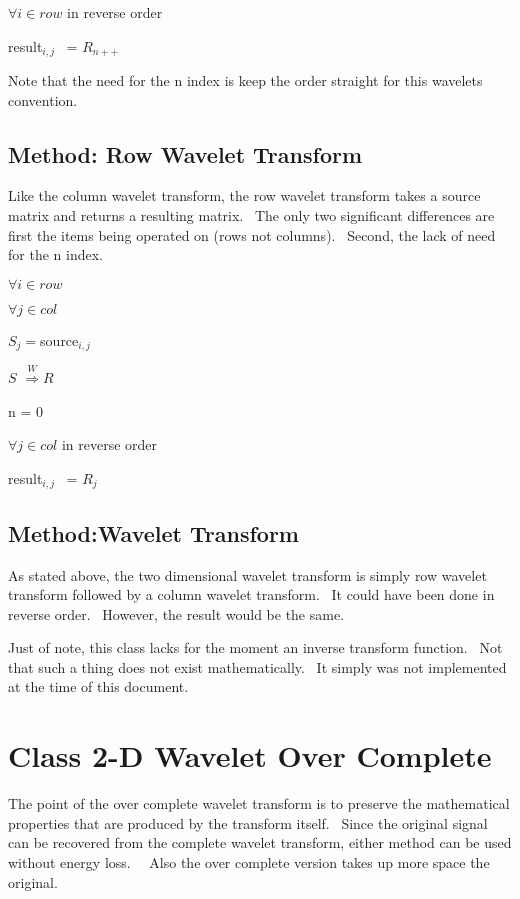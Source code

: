\documentclass{article}
\begin{document}
\qquad \qquad $\forall i\in row$ in reverse order

\qquad \qquad \qquad result$_{i,j}$ \ = $R_{n++}$

\bigskip Note that the need for the n index is keep the order straight for
this wavelets convention. \ 

\bigskip 

\subsection{Method: Row Wavelet Transform}

\bigskip Like the column wavelet transform, the row wavelet transform takes
a source matrix and returns a resulting matrix. \ The only two significant
differences are first the items being operated on (rows not columns). \
Second, the lack of need for the n index. \ 

\qquad $\forall i\in row$

\qquad \qquad $\forall j\in col$ 

\qquad \qquad \qquad $S_{j}=$source$_{i,j}$

\qquad \qquad $S$ $\overset{W}{\Rightarrow }R$

\qquad \qquad n = 0

\qquad \qquad $\forall j\in col$ in reverse order

\qquad \qquad \qquad result$_{i,j}$ \ = $R_{j}$

\subsection{Method:Wavelet Transform}

\bigskip As stated above, the two dimensional wavelet transform is simply
row wavelet transform followed by a column wavelet transform. \ It could
have been done in reverse order. \ However, the result would be the same. \ 

Just of note, this class lacks for the moment an inverse transform function.
\ Not that such a thing does not exist mathematically. \ It simply was not
implemented at the time of this document. \ 

\bigskip 

\bigskip 

\section{Class 2-D Wavelet Over Complete}

The point of the over complete wavelet transform is to preserve the
mathematical properties that are produced by the transform itself. \ Since
the original signal can be recovered from the complete wavelet transform,
either method can be used without energy loss. \ \ Also the over complete
version takes up more space the original. \ 
\end{document}
